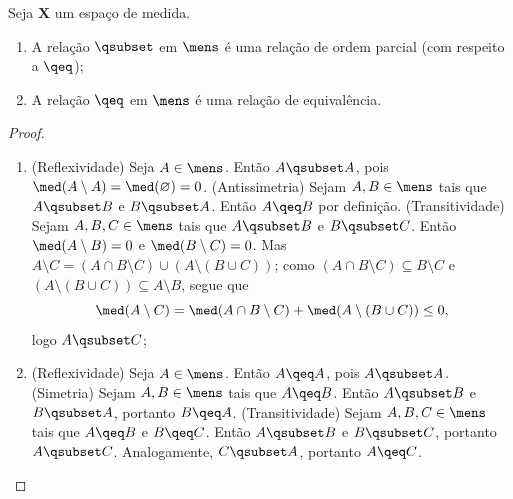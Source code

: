 \begin{prop}
Seja $\bm X$ um espaço de medida.
	\begin{enumerate}
	\item A relação $\qsubset$ em $\mens$
	é uma relação de ordem parcial (com respeito a $\qeq$);
	\item A relação $\qeq$ em $\mens$
	é uma relação de equivalência.
	\end{enumerate}
\end{prop}
\begin{proof}
	\begin{enumerate}
	\item (Reflexividade) Seja $A \in \mens$. Então $A \qsubset A$, pois $\med(A \setminus A) =\med(\emptyset)=0$. (Antissimetria) Sejam $A,B \in \mens$ tais que $A \qsubset B$ e $B \qsubset A$. Então $A \qeq B$ por definição. (Transitividade) Sejam $A,B,C \in \mens$ tais que $A \qsubset B$ e $B \qsubset C$. Então $\med(A \setminus B)=0$ e $\med(B \setminus C) = 0$. Mas $A \setminus C = (A \cap B \setminus C) \cup (A \setminus (B \cup C))$; como $(A \cap B \setminus C) \subseteq B \setminus C$ e $(A \setminus (B \cup C)) \subseteq A \setminus B$, segue que
		\begin{equation*}
		\med(A \setminus C) = \med(A \cap B \setminus C) + \med(A \setminus (B \cup C)) \leq 0,
		\end{equation*}
logo $A \qsubset C$;
	
	\item (Reflexividade) Seja $A \in \mens$. Então $A \qeq A$, pois $A \qsubset A$. (Simetria) Sejam $A,B \in \mens$ tais que $A \qeq B$. Então $A \qsubset B$ e $B \qsubset A$, portanto $B \qeq A$. (Transitividade) Sejam $A,B,C \in \mens$ tais que $A \qeq B$ e $B \qeq C$. Então $A \qsubset B$ e $B \qsubset C$, portanto $A \qsubset C$. Analogamente, $C \qsubset A$, portanto $A \qeq C$.

	\end{enumerate}
\end{proof}

